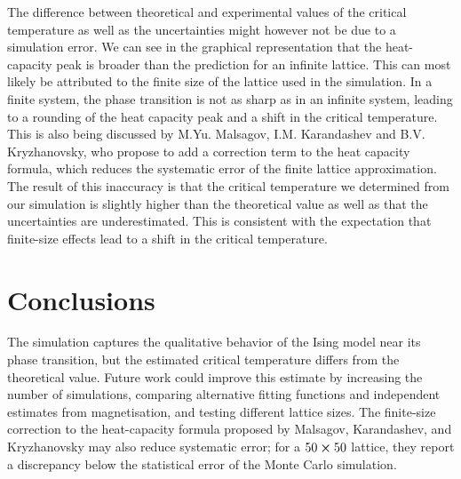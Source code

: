\documentclass[twocolumn,a4paper,aps,amsmath,amssymb,floatfix,superscriptaddress]{revtex4-2}
\begin{document}
    The difference between theoretical and experimental values of the critical temperature as well as the uncertainties might however not be due to a simulation error. We can see in the graphical representation that the heat-capacity peak is broader than the prediction for an infinite lattice. This can most likely be attributed to the finite size of the lattice used in the simulation. In a finite system, the phase transition is not as sharp as in an infinite system, leading to a rounding of the heat capacity peak and a shift in the critical temperature. This is also being discussed by M.Yu. Malsagov, I.M. Karandashev and B.V. Kryzhanovsky\cite{Malsagov2017}, who propose to add a correction term to the heat capacity formula, which reduces the systematic error of the finite lattice approximation. The result of this inaccuracy is that the critical temperature we determined from our simulation is slightly higher than the theoretical value as well as that the uncertainties are underestimated. This is consistent with the expectation that finite-size effects lead to a shift in the critical temperature.\\

\vspace{-1cm}
\section{Conclusions}\label{conclusions}
\vspace{-0.3cm}
    The simulation captures the qualitative behavior of the Ising model near its phase transition, but the estimated critical temperature differs from the theoretical value. Future work could improve this estimate by increasing the number of simulations, comparing alternative fitting functions and independent estimates from magnetisation, and testing different lattice sizes. The finite-size correction to the heat-capacity formula proposed by Malsagov, Karandashev, and Kryzhanovsky may also reduce systematic error; for a $50 \cross 50$ lattice, they report a discrepancy below the statistical error of the Monte Carlo simulation\cite{Malsagov2017}.



\vspace{-0.3cm}

\end{document}
